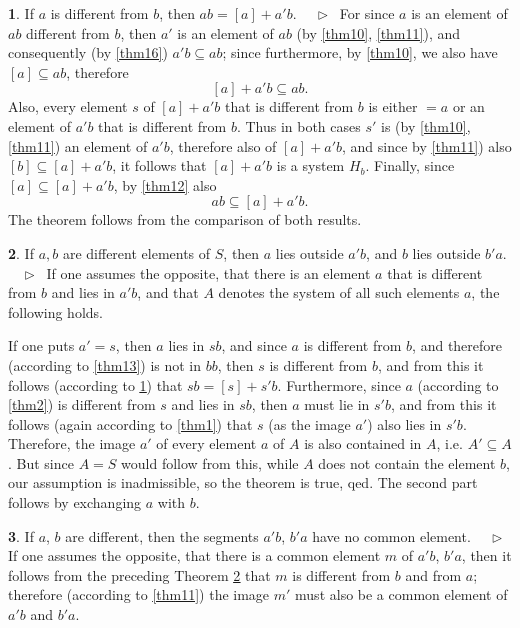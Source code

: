 \documentclass[leqno,hidelinks]{article}
\theoremstyle{definition}
\newtheorem{satz}{\protect\satzname}
\newcommand{\satzname}{}
\renewcommand{\satzname}{\hspace{-4pt}.\ Satz}%
\renewcommand{\satzname}{\hspace{-4pt}.\ Theorem}%
\newcommand\Beweis{\medskip \newline $ \phantom{'.'} \rhd \ $}%
\newcommand{\partof}{\subseteq}
\newcommand{\sref}[1]{\underline{\ref{#1}}}%
\begin{document}
\begin{paracol}{2}
\begin{satz}\label{thm18}
If $a$ is different from $b$, then $ab = [a] + a'b$.
\Beweis
For since $a$ is an element of $ab$ different from $b$, then $a'$ is an element
of $ab$ (by \sref{thm10}, \sref{thm11}), and consequently (by \sref{thm16})
$a'b \partof ab$; since furthermore, by \sref{thm10}, we also have $[a]
\partof ab$, therefore
\[
	[a] + a'b \partof ab.
\]
Also, every element $s$ of $[a] + a'b$ that is different from $b$ is either
$= a$ or an element of $a'b$ that is different from $b$. Thus in both cases $s'$
is (by \sref{thm10}, \sref{thm11}) an element of $a'b$, therefore also of
$[a]+ a'b$, and since by \sref{thm11}) also $[b] \partof [a] + a'b$, it follows
that $[a] + a'b$ is a system $H_b$. Finally, since $[a] \partof [a] + a'b$, by
\sref{thm12} also
\[
	ab \partof [a] + a' b.
\]
The theorem follows from the comparison of both results.
\end{satz}

\newpage

\begin{satz}\label{thm19}
If $a, b$ are different elements of $S$, then $a$ lies outside $a'b$, and $b$ lies
outside $b'a$.
\Beweis
If one assumes the opposite, that there is an element $a$ that is different from
$b$ and lies in $a'b$, and that $A$ denotes the system of all such elements $a$,
the following holds.

If one puts $a'=s$, then $a$ lies in $sb$, and since $a$ is different from $b$,
and therefore (according to \sref{thm13}) is not in $bb$, then $s$ is different
from $b$, and from this it follows (according to \sref{thm18}) that $sb = [s] + s'b$.
Furthermore, since $a$ (according to \sref{thm2}) is different from $s$ and lies
in $sb$, then $a$ must lie in $s'b$, and from this it follows (again according to
\sref{thm1}) that $s$ (as the image $a'$) also lies in $s'b$.%
Therefore, the image $a'$ of every element $a$ of $A$ is also contained in $A$,
i.e. $A' \partof A$. But since $A=S$ would follow from this, while $A$ does not
contain the element $b$, our assumption is inadmissible, so the theorem is true,
qed.
The second part follows by exchanging $a$ with $b$.%
\end{satz}

\begin{satz}\label{thm20}
If $a$, $b$ are different, then the segments $a'b$, $b'a$ have no common element.
\Beweis
If one assumes the opposite, that there is a common element $m$ of $a'b$, $b'a$,
then it follows from the preceding Theorem \sref{thm19} that $m$ is different from
$b$ and from $a$; therefore (according to \sref{thm11}) the image $m'$ must also be
a common element of $a'b$ and $b'a$.%


\end{satz}
\end{paracol}
\end{document}

